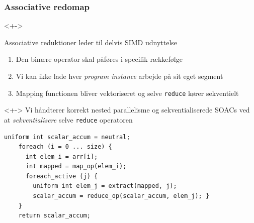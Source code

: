 \documentclass[t]{beamer}
\begin{document}
\begin{frame}[fragile]
  \frametitle{Associative redomap}
  \begin{onlyenv}<+->
    \begin{block}{Associative reduktioner leder til delvis SIMD udnyttelse}
      \begin{enumerate}
        \item Den binære operator skal påføres i specifik rækkefølge
        \item Vi kan ikke lade hver \textit{program instance} arbejde på sit eget segment
        \item Mapping functionen bliver vektoriseret og selve \texttt{reduce} kører sekventielt
      \end{enumerate}
    \end{block}
  \end{onlyenv}
  \begin{onlyenv}<+->
    Vi håndterer korrekt nested parallelisme og sekventialiserede SOACs ved at \textit{sekventialisere} selve \texttt{reduce} operatoren
\begin{lstlisting}[language=ispc]
    uniform int scalar_accum = neutral;
    foreach (i = 0 ... size) {
      int elem_i = arr[i];
      int mapped = map_op(elem_i);
      foreach_active (j) {
        uniform int elem_j = extract(mapped, j);
        scalar_accum = reduce_op(scalar_accum, elem_j); }
    }
    return scalar_accum;
\end{lstlisting}
  \end{onlyenv}
\end{frame}
\end{document}
